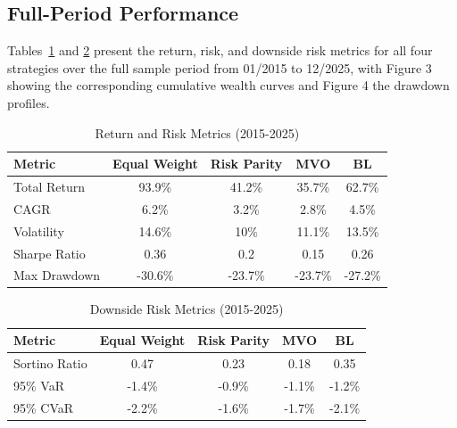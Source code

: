\documentclass[a4paper,alpha-refs]{scr-contemporary}
\numberwithin{equation}{section}
\begin{document}
\subsection{Full-Period Performance}

\indent \indent Tables~\ref{tab:returns_risk} and \ref{tab:downside_risk} present the return, risk, and downside risk metrics for all four strategies 
over the full sample period from 01/2015 to 12/2025, with Figure 3 showing the corresponding 
cumulative wealth curves and Figure 4 the drawdown profiles. \\

\begin{table}[h]
\begin{center}
\caption{Return and Risk Metrics (2015-2025)}
\label{tab:returns_risk}
\begin{tabular}{lcccc}
\toprule
\textbf{Metric} & \textbf{Equal Weight} & \textbf{Risk Parity} & \textbf{MVO} & \textbf{BL} \\
\midrule
Total Return  &  93.9\%  & 41.2\%  & 35.7\%  & 62.7\%  \\
CAGR          &   6.2\%  &  3.2\%  &  2.8\%  &  4.5\%  \\
Volatility    &  14.6\%  & 10\%  & 11.1\%  & 13.5\%  \\
Sharpe Ratio  &    0.36  &    0.2  &    0.15  &    0.26  \\
Max Drawdown  &  -30.6\% & -23.7\% & -23.7\% & -27.2\% \\
\bottomrule
\end{tabular}
\end{center}
\end{table}

\vspace{-8mm}

\begin{table}[h]
\centering
\caption{Downside Risk Metrics (2015-2025)}
\label{tab:downside_risk}
\begin{tabular}{lcccc}
\toprule
\textbf{Metric} & \textbf{Equal Weight} & \textbf{Risk Parity} & \textbf{MVO} & \textbf{BL} \\
\midrule
Sortino Ratio &  0.47   &  0.23   &  0.18   &  0.35   \\
95\% VaR      & -1.4\% & -0.9\% & -1.1\% & -1.2\% \\
95\% CVaR     & -2.2\% & -1.6\% & -1.7\% & -2.1\% \\
\bottomrule
\end{tabular}
\end{table}
\end{document}
